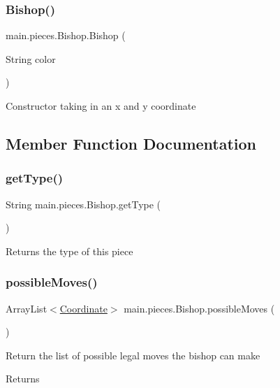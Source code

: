 \subsubsection{\texorpdfstring{Bishop()}{Bishop()}}
{\footnotesize\ttfamily main.\+pieces.\+Bishop.\+Bishop (\begin{DoxyParamCaption}\item[{String}]{color }\end{DoxyParamCaption})}

Constructor taking in an x and y coordinate 

\subsection{Member Function Documentation}
\hypertarget{classmain_1_1pieces_1_1_bishop_a99e4744c895f53d2d9c46c83a77be273}{}\label{classmain_1_1pieces_1_1_bishop_a99e4744c895f53d2d9c46c83a77be273} 
\subsubsection{\texorpdfstring{get\+Type()}{getType()}}
{\footnotesize\ttfamily String main.\+pieces.\+Bishop.\+get\+Type (\begin{DoxyParamCaption}{ }\end{DoxyParamCaption})}

Returns the type of this piece \hypertarget{classmain_1_1pieces_1_1_bishop_a9abb24030574df6017a2f994125c5959}{}\label{classmain_1_1pieces_1_1_bishop_a9abb24030574df6017a2f994125c5959} 
\subsubsection{\texorpdfstring{possible\+Moves()}{possibleMoves()}}
{\footnotesize\ttfamily Array\+List$<$\hyperlink{classmain_1_1model_1_1_coordinate}{Coordinate}$>$ main.\+pieces.\+Bishop.\+possible\+Moves (\begin{DoxyParamCaption}{ }\end{DoxyParamCaption})}

Return the list of possible legal moves the bishop can make \begin{DoxyReturn}{Returns}

\end{DoxyReturn}
\hypertarget{classmain_1_1pieces_1_1_bishop_a6621662a277c0a45fb317b7d37612410}{}\label{classmain_1_1pieces_1_1_bishop_a6621662a277c0a45fb317b7d37612410} 
